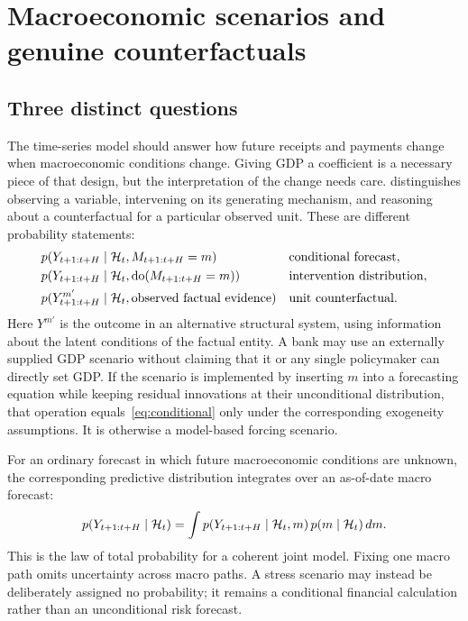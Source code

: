 \chapter{Macroeconomic scenarios and genuine counterfactuals}
\label{ch:cf}
\section{Three distinct questions}
The time-series model should answer how future receipts and payments change when macroeconomic conditions change. Giving GDP a coefficient is a necessary piece of that design, but the interpretation of the change needs care. \citet[Sections 3.2--3.4]{pearl2009} distinguishes observing a variable, intervening on its generating mechanism, and reasoning about a counterfactual for a particular observed unit. These are different probability statements:
\begin{align}
&p(Y_{t+1:t+H}\mid\mathcal H_t,M_{t+1:t+H}=m)
&&\text{conditional forecast},\label{eq:conditional}\\
&p(Y_{t+1:t+H}\mid\mathcal H_t,\operatorname{do}(M_{t+1:t+H}=m))
&&\text{intervention distribution},\label{eq:intervention}\\
&p(Y^{m'}_{t+1:t+H}\mid\mathcal H_t,\text{observed factual evidence})
&&\text{unit counterfactual}.\label{eq:unitcf}
\end{align}
Here $Y^{m'}$ is the outcome in an alternative structural system, using information about the latent conditions of the factual entity. A bank may use an externally supplied GDP scenario without claiming that it or any single policymaker can directly set GDP. If the scenario is implemented by inserting $m$ into a forecasting equation while keeping residual innovations at their unconditional distribution, that operation equals~\eqref{eq:conditional} only under the corresponding exogeneity assumptions. It is otherwise a model-based forcing scenario.

For an ordinary forecast in which future macroeconomic conditions are unknown, the corresponding predictive distribution integrates over an as-of-date macro forecast:
\begin{equation}
p(Y_{t+1:t+H}\mid\mathcal H_t)=\int p(Y_{t+1:t+H}\mid\mathcal H_t,m)\,p(m\mid\mathcal H_t)\,dm.
\end{equation}
This is the law of total probability for a coherent joint model. Fixing one macro path omits uncertainty across macro paths. A stress scenario may instead be deliberately assigned no probability; it remains a conditional financial calculation rather than an unconditional risk forecast.

